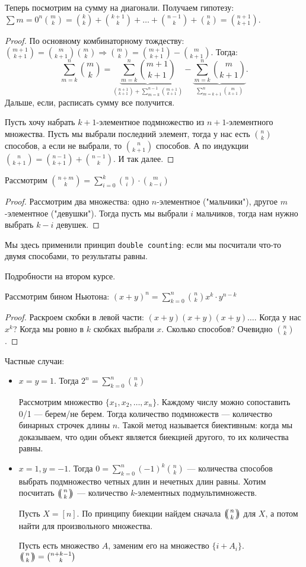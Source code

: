 Теперь посмотрим на сумму на диагонали. Получаем гипотезу: $\sum{m=0}^n \binom{m}{k}=\binom{k}{k} + \binom{k+1}{k} + \ldots + \binom{n-1}{k} + \binom{n}{k} = \binom{n+1}{k+1}$.
\begin{proof}
    По основному комбинаторному тождеству: $\binom{m + 1}{k + 1} = \binom{m}{k + 1}  \binom{m}{k} \Rightarrow \binom{m}{k} = \binom{m + 1}{k + 1} - \binom{m}{k+1}$. Тогда: \[
        \sum_{m=k}^{n} \binom{m}{k} = \underbrace{\sum_{m=k}^n \binom{m+1}{k+1}}_{\binom{n+1}{k+1} + \sum_{m=k}^{n-1} \binom{m+1}{k+1} } - \underbrace{\sum_{m=k}^{n} \binom{m}{k+1}}_{\sum_{m=k+1}^{n} \binom{m}{k+1}}
    .\] 
    Дальше, если, расписать сумму все получится.

    Пусть хочу набрать $k+1$-элементное подмножество из  $n+1$-элементного множества. Пусть мы выбрали последний элемент, тогда у нас есть $\binom{n}{k}$ способов, а если не выбрали, то  $\binom{n}{k+1}$ способов. А по индукции  $\binom{n}{k+1} = \binom{n-1}{k+1} + \binom{n - 1}{k}$. И так далее.
\end{proof}
\slashn
Рассмотрим $\binom{n+m}{k} = \sum_{i=0}^k \binom{n}{i} \cdot \binom{m}{k-i}$
 \begin{proof}
     Рассмотрим два множества: одно $n$-элементное ("мальчики"), другое  $m$-элементное ("девушки"). Тогда пусть мы выбрали  $i$ мальчиков, тогда нам нужно выбрать $k-i$ девушек. 
\end{proof}
\slashn
Мы здесь применили принцип \texttt{double counting}: если мы посчитали что-то двумя способами, то результаты равны.

Подробности на втором курсе.

Рассмотрим бином Ньютона: $(x+y)^n = \sum_{k=0}^n \binom{n}{k} x^k \cdot y^{n-k}$
\begin{proof}
    Раскроем скобки в левой части: $(x+y)(x+y)(x+y)\ldots$. Когда у нас $x^k$? Когда мы ровно в  $k$ скобках выбрали  $x$. Сколько способов? Очевидно  $\binom{n}{k}$.
\end{proof}
Частные случаи:
\begin{itemize}
    \item $x=y=1$. Тогда  $2^n = \sum_{k=0}^n \binom{n}{k}$
    
        Рассмотрим множество $\{x_1,x_2,\ldots,x_n\}$. Каждому числу можно сопоставить 0/1 --- берем/не берем. Тогда количество подмножеств --- количество бинарных строчек длины $n$. Такой метод называется биективным: когда мы доказываем, что один объект является биекцией другого, то их количества равны.
    \item $x = 1, y = -1$. Тогда  $0 = \sum_{k=0}^n (-1)^k \binom{n}{k}$ --- количества способов выбрать подмножество четных длин и нечетных длин равны.
Хотим посчитать $\multiset{n}{k}$ --- количество  $k$-элементных подмультимножеств.

Пусть $X = [n]$. По принципу биекции найдем сначала $\multiset{n}{k}$ для  $X$, а потом найти для произвольного множества. 

Пусть есть множество  $A$, заменим его на множество  $\{ i + A_i\}$. $\multiset{n}{k} = \binom{n+k-1}{k}$
\end{itemize}

